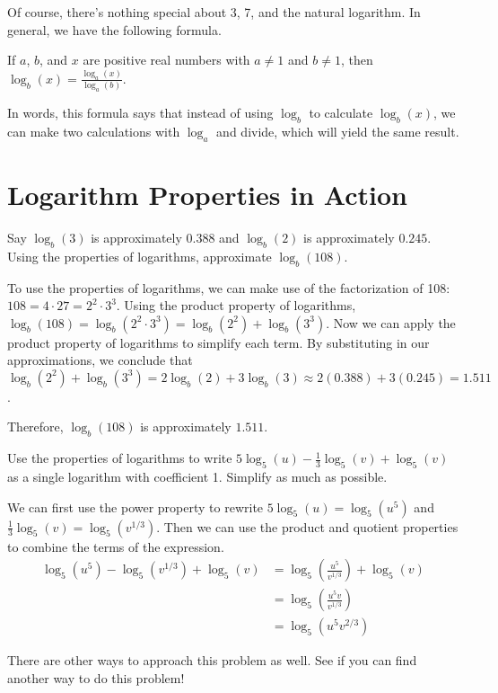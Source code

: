 \documentclass[nooutcomes]{ximera}
\begin{document}
Of course, there's nothing special about 3, 7, and the natural logarithm. In general, we have the following formula.
\begin{callout}
If $a$, $b$, and $x$ are positive real numbers with $a \ne 1$ and $b \ne 1$, then $\log_b(x) = \frac{\log_a(x)}{\log_a(b)}$.
\end{callout}

In words, this formula says that instead of using $\log_b$ to calculate $\log_b(x)$, we can make two calculations with $\log_a$ and divide, which will yield the same result. 

\section{Logarithm Properties in Action}
\begin{example}
Say $\log_b(3)$ is approximately $0.388$ and $\log_b(2)$ is approximately $0.245$. Using the properties of logarithms, approximate $\log_b(108)$. 


	\begin{explanation}
	To use the properties of logarithms, we can make use of the factorization of 108: $108 = 4 \cdot 27 = 2^2 \cdot 3^3$. Using the product property of logarithms, $\log_b(108) = \log_b(2^2 \cdot 3^3) = \log_b(2^2) + \log_b(3^3)$. Now we can apply the product property of logarithms to simplify each term. By substituting in our approximations, we conclude that $\log_b(2^2) + \log_b(3^3) = 2\log_b(2) + 3\log_b(3) \approx 2(0.388) + 3(0.245) = 1.511$. 

Therefore, $\log_b(108)$ is approximately $1.511$. 
	\end{explanation}
\end{example}

\begin{example}
Use the properties of logarithms to write $5\log_5(u) - \frac{1}{3}\log_5(v) + \log_5(v)$ as a single logarithm with coefficient 1. Simplify as much as possible.

	\begin{explanation}
	We can first use the power property to rewrite $5\log_5(u) = \log_5(u^5)$ and $\frac{1}{3}\log_5(v) = \log_5(v^{1/3})$. Then we can use the product and quotient properties to combine the terms of the expression.
\begin{align*}
 \log_5(u^5) - \log_5(v^{1/3}) + \log_5(v) & = \log_5\left(\frac{u^5}{v^{1/3}}\right) + \log_5(v) \\
& = \log_5\left(\frac{u^5v}{v^{1/3}}\right) \\
& = \log_5(u^5v^{2/3})
\end{align*}

There are other ways to approach this problem as well. See if you can find another way to do this problem!
	\end{explanation}
\end{example}
\end{document}
